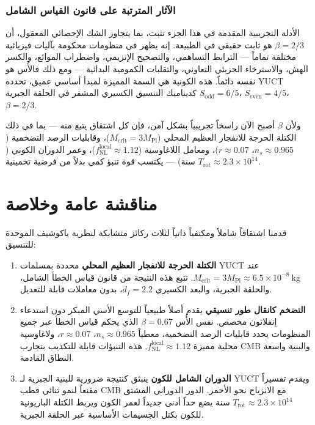 \documentclass[12pt,a4paper]{article}
\begin{document}
	\section{الآثار المترتبة على قانون القياس الشامل}
	
	الأدلة التجريبية المقدمة في هذا الجزء تثبت، بما يتجاوز الشك الإحصائي المعقول، أن \(\beta = 2/3\) هو ثابت حقيقي في الطبيعة. إنه يظهر في منظومات محكومة بآليات فيزيائية مختلفة تماماً — الترابط التساهمي، والتصحيح الإنزيمي، واضطراب الموائع، والكسر الهش، والاسترخاء الجزيئي التعاوني، والتقلبات الكمومية البدائية — ومع ذلك فالأُس هو نفسه دائماً. هذه الكونية هي السمة المميزة لمبدأ أساسي عميق، تحدده YUCT كديناميك التنسيق الكسيري المشفر في الحلقة الجبرية \(S_{\mathrm{odd}} = 6/5\)، \(S_{\mathrm{even}} = 4/5\)، \(\beta = 2/3\).
	
	ولأن \(\beta\) أصبح الآن راسخاً تجريبياً بشكل آمن، فإن كل اشتقاق يتبع منه — بما في ذلك الكتلة الحرجة للانفجار العظيم المحلي (\(M_{\mathrm{crit}} = 3M_{\mathrm{Pl}}\))، وقابليات الرصد التضخمية (\(n_s \approx 0.965\)، \(r \approx 0.07\))، ومعامل اللاغاوسية (\(f_{\mathrm{NL}}^{\mathrm{local}} \approx 1.12\))، وعمر الدوران الكوني (\(T_{\mathrm{rot}} \approx 2.3\times10^{14}\) سنة) — يكتسب قوة تنبؤ كمي بدلاً من فرضية تخمينية.
	
	\part{مناقشة عامة وخلاصة}
	\label{part:conclusion}
	
	قدمنا اشتقاقاً شاملاً ومكتفياً ذاتياً لثلاث ركائز متشابكة لنظرية ياكوشيف الموحدة للتنسيق:
	
	\begin{enumerate}
		\item \textbf{الكتلة الحرجة للانفجار العظيم المحلي} محددة بمسلمات YUCT عند \(M_{\mathrm{crit}} = 3 M_{\mathrm{Pl}} \approx 6.5 \times 10^{-8}\ \text{kg}\). تتبع هذه النتيجة من قانون قياس الخطأ الشامل، والحلقة الجبرية، والبعد الكسيري \(d_f = 2.2\)، بدون معاملات قابلة للتعديل.
		
		\item \textbf{التضخم كانقال طور تنسيقي} يقدم أصلاً طبيعياً للتوسع الأسي المبكر دون استدعاء إنفلاتون مخصص. نفس الأُس \(\beta = 0.67\) الذي يحكم قياس الخطأ عبر جميع المنظومات يحدد قابليات الرصد التضخمية، معطياً \(n_s \approx 0.965\)، \(r \approx 0.07\)، ولاغاوسية محلية مميزة \(f_{\mathrm{NL}}^{\mathrm{local}} \approx 1.12\). هذه التنبؤات قابلة للتكذيب بتجارب CMB والبنية واسعة النطاق القادمة.
		
		\item \textbf{الدوران الشامل للكون} ينبثق كنتيجة ضرورية للبنية الجبرية لـ YUCT ويقدم تفسيراً مقنعاً لنمو ثنائي قطب CMB مع الانزياح نحو الأحمر. الدور الدوراني المشتق \(T_{\mathrm{rot}} \approx 2.3 \times 10^{14}\) سنة يضع حداً أدنى جديداً لعمر الكون ويربط الكتلة الباريونية للكون بكتل الجسيمات الأساسية عبر الحلقة الجبرية.
	\end{enumerate}
	
\end{document}
